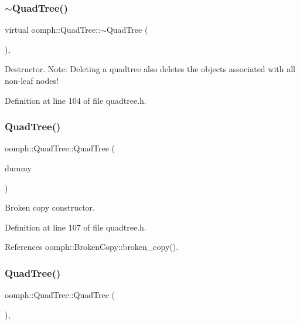 \subsubsection{\texorpdfstring{$\sim$\+Quad\+Tree()}{~QuadTree()}}
{\footnotesize\ttfamily virtual oomph\+::\+Quad\+Tree\+::$\sim$\+Quad\+Tree (\begin{DoxyParamCaption}{ }\end{DoxyParamCaption})\hspace{0.3cm}{\ttfamily [inline]}, {\ttfamily [virtual]}}



Destructor. Note\+: Deleting a quadtree also deletes the objects associated with all non-\/leaf nodes! 



Definition at line 104 of file quadtree.\+h.

\mbox{\label{classoomph_1_1QuadTree_a6eaeaee810370ab90cec37e70d9cdaa3}} 
\subsubsection{\texorpdfstring{Quad\+Tree()}{QuadTree()}\hspace{0.1cm}{\footnotesize\ttfamily [1/4]}}
{\footnotesize\ttfamily oomph\+::\+Quad\+Tree\+::\+Quad\+Tree (\begin{DoxyParamCaption}\item[{const \hyperlink{classoomph_1_1QuadTree}{Quad\+Tree} \&}]{dummy }\end{DoxyParamCaption})\hspace{0.3cm}{\ttfamily [inline]}}



Broken copy constructor. 



Definition at line 107 of file quadtree.\+h.



References oomph\+::\+Broken\+Copy\+::broken\+\_\+copy().

\mbox{\label{classoomph_1_1QuadTree_aa56c6ca60d708eee10217cb341399fe3}} 
\subsubsection{\texorpdfstring{Quad\+Tree()}{QuadTree()}\hspace{0.1cm}{\footnotesize\ttfamily [2/4]}}
{\footnotesize\ttfamily oomph\+::\+Quad\+Tree\+::\+Quad\+Tree (\begin{DoxyParamCaption}{ }\end{DoxyParamCaption})\hspace{0.3cm}{\ttfamily [inline]}, {\ttfamily [protected]}}



